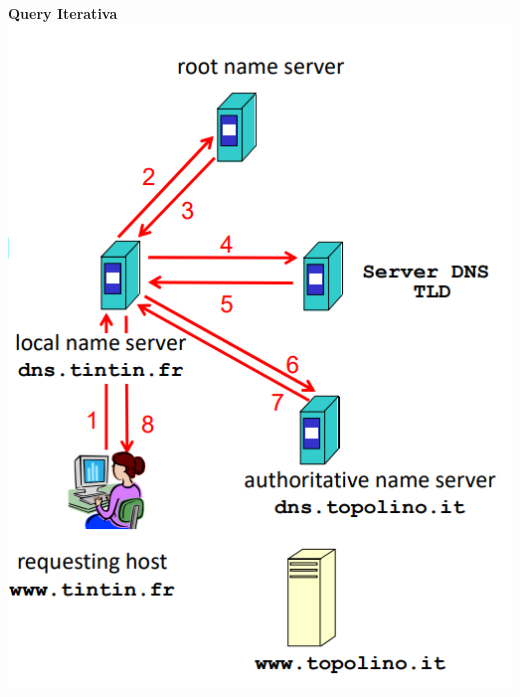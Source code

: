 \documentclass[10pt]{article}
\begin{document}
\begin{multicols}{2}
\textbf{Query Iterativa}\\
\includegraphics[scale=0.6]{dnsqueryiterativa.png}\\\\\\\\\\




\end{multicols}
\end{document}
